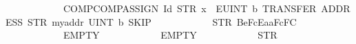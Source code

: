 \begin{isabellebody}
\ \ \ \ \ \ \ \ \ \ \ \ {\isacharparenleft}{\kern0pt}COMP{\isacharparenleft}{\kern0pt}COMP{\isacharparenleft}{\kern0pt}{\isacharparenleft}{\kern0pt}{\isacharparenleft}{\kern0pt}ASSIGN\ {\isacharparenleft}{\kern0pt}Id\ {\isacharparenleft}{\kern0pt}STR\ {\isacharprime}{\kern0pt}{\isacharprime}{\kern0pt}x{\isacharprime}{\kern0pt}{\isacharprime}{\kern0pt}{\isacharparenright}{\kern0pt}{\isacharparenright}{\kern0pt}\ \ {\isacharparenleft}{\kern0pt}E{\isachardot}{\kern0pt}UINT\ b{}\ {}{\isacharparenright}{\kern0pt}{\isacharparenright}{\kern0pt}{\isacharparenright}{\kern0pt}{\isacharparenright}{\kern0pt}{\isacharparenleft}{\kern0pt}TRANSFER\ {\isacharparenleft}{\kern0pt}ADDRESS\ {\isacharparenleft}{\kern0pt}STR\ {\isacharprime}{\kern0pt}{\isacharprime}{\kern0pt}myaddr{\isacharprime}{\kern0pt}{\isacharprime}{\kern0pt}{\isacharparenright}{\kern0pt}{\isacharparenright}{\kern0pt}\ {\isacharparenleft}{\kern0pt}UINT\ b{}{}{}\ {}{\isacharparenright}{\kern0pt}{\isacharparenright}{\kern0pt}{\isacharparenright}{\kern0pt}{\isacharparenleft}{\kern0pt}SKIP{\isacharparenright}{\kern0pt}{\isacharparenright}{\kern0pt}\isanewline
\ \ \ \ \ \ \ \ \ \ \ \ {\isacharparenleft}{\kern0pt}STR\ {\isacharprime}{\kern0pt}{\isacharprime}{\kern0pt}{}{}{}Be{}{}{}{}FcEa{}{}aF{}{}{}{}{}{}{}{}{}c{}{}F{}{}{}{}{}{}C{}{}{}{\isacharprime}{\kern0pt}{\isacharprime}{\kern0pt}{\isacharparenright}{\kern0pt}\isanewline
\ \ \ \ \ \ \ \ \ \ \ \ EMPTY\isanewline
\ \ \ \ \ \ \ \ \ \ \ \ EMPTY\isanewline
\ \ \ \ \ \ \ \ \ \ \ \ {\isacharparenleft}{\kern0pt}STR\ {\isacharprime}{\kern0pt}{\isacharprime}{\kern0pt}{}{\isacharprime}{\kern0pt}{\isacharprime}{\kern0pt}{\isacharparenright}{\kern0pt}\isanewline

\end{isabellebody}
